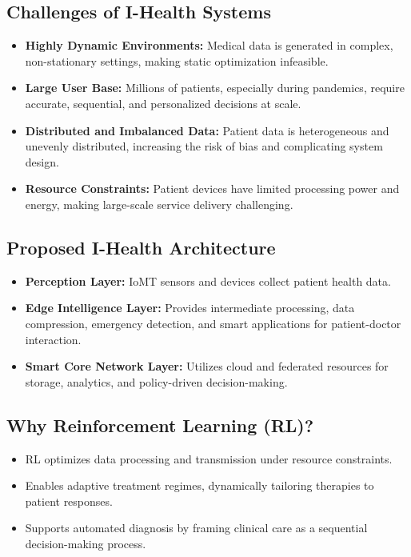 \subsection*{Challenges of I-Health Systems}
\begin{itemize}
    \item \textbf{Highly Dynamic Environments:} Medical data is generated in complex, non-stationary settings, making static optimization infeasible.
    \item \textbf{Large User Base:} Millions of patients, especially during pandemics, require accurate, sequential, and personalized decisions at scale.
    \item \textbf{Distributed and Imbalanced Data:} Patient data is heterogeneous and unevenly distributed, increasing the risk of bias and complicating system design.
    \item \textbf{Resource Constraints:} Patient devices have limited processing power and energy, making large-scale service delivery challenging.
\end{itemize}

\subsection*{Proposed I-Health Architecture}
\begin{itemize}
    \item \textbf{Perception Layer:} IoMT sensors and devices collect patient health data.
    \item \textbf{Edge Intelligence Layer:} Provides intermediate processing, data compression, emergency detection, and smart applications for patient-doctor interaction.
    \item \textbf{Smart Core Network Layer:} Utilizes cloud and federated resources for storage, analytics, and policy-driven decision-making.
\end{itemize}

\subsection*{Why Reinforcement Learning (RL)?}
\begin{itemize}
    \item RL optimizes data processing and transmission under resource constraints.
    \item Enables adaptive treatment regimes, dynamically tailoring therapies to patient responses.
    \item Supports automated diagnosis by framing clinical care as a sequential decision-making process.
\end{itemize}

